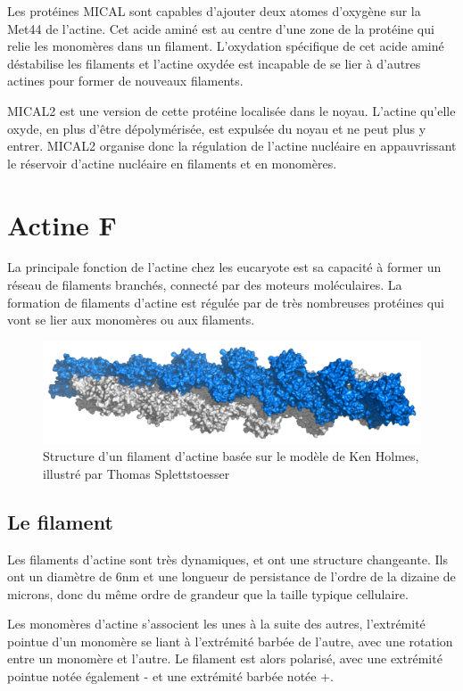 Les protéines MICAL sont capables d'ajouter deux atomes d'oxygène sur la Met44 de l'actine. Cet acide aminé est au centre d'une zone de la protéine qui relie les monomères dans un filament. 
L'oxydation spécifique de cet acide aminé déstabilise les filaments et l'actine oxydée est incapable de se lier à d'autres actines pour former de nouveaux filaments. 

MICAL2 est une version de cette protéine localisée dans le noyau. L'actine qu'elle oxyde, en plus d'être dépolymérisée, est expulsée du noyau et ne peut plus y entrer. MICAL2 organise donc la régulation de l'actine nucléaire en appauvrissant le réservoir d'actine nucléaire en filaments et en monomères. 




\section{Actine F}

La principale fonction de l'actine chez les eucaryote est sa capacité à former un réseau de filaments branchés, connecté par des moteurs moléculaires. 
La formation de filaments d'actine est régulée par de très nombreuses protéines qui vont se lier aux monomères ou aux filaments. 

\begin{figure}
\includegraphics[scale=0.3]{Actin_filament_atomic_model.png}
\caption{Structure d'un filament d'actine basée sur le modèle de Ken Holmes, illustré par Thomas Splettstoesser}
\end{figure}

\subsection{Le filament}

Les filaments d'actine sont très dynamiques, et ont une structure changeante. Ils ont un diamètre de 6nm et une longueur de persistance de l'ordre de la dizaine de microns, donc du même ordre de grandeur que la taille typique cellulaire. 

Les monomères d'actine s'associent les unes à la suite des autres, l'extrémité pointue d'un monomère se liant à l'extrémité barbée de l'autre, avec une rotation entre un monomère et l'autre. 
Le filament est alors polarisé, avec une extrémité pointue notée également - et une extrémité barbée notée +. 

